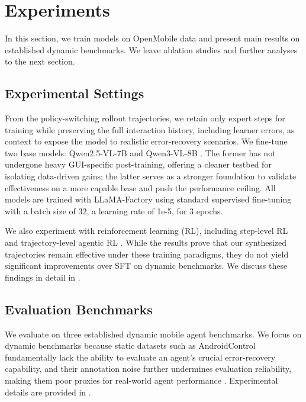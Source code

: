 \documentclass{article} %
\begin{document}
\section{Experiments}

In this section, we train models on OpenMobile data and present main results on established dynamic benchmarks.
We leave ablation studies and further analyses to the next section.

\subsection{Experimental Settings}

From the policy-switching rollout trajectories, we retain only expert steps for training while preserving the full interaction history, including learner errors, as context to expose the model to realistic error-recovery scenarios.
We fine-tune two base models: Qwen2.5-VL-7B and Qwen3-VL-8B \citep{bai2025qwen3}.
The former has not undergone heavy GUI-specific post-training, offering a cleaner testbed for isolating data-driven gains; the latter serves as a stronger foundation to validate effectiveness on a more capable base and push the performance ceiling.
All models are trained with LLaMA-Factory \citep{zheng2024llamafactory} using standard supervised fine-tuning with a batch size of 32, a learning rate of 1e-5, for 3 epochs.

We also experiment with reinforcement learning (RL), including step-level RL \citep{lu2026ui} and trajectory-level agentic RL \citep{li2026themis}.
While the results prove that our synthesized trajectories remain effective under these training paradigms, they do not yield significant improvements over SFT on dynamic benchmarks.
We discuss these findings in detail in .

\subsection{Evaluation Benchmarks}

We evaluate on three established dynamic mobile agent benchmarks.
We focus on dynamic benchmarks because static datasets such as AndroidControl fundamentally lack the ability to evaluate an agent's crucial error-recovery capability, and their annotation noise further undermines evaluation reliability, making them poor proxies for real-world agent performance \citep{lu2025ui, gao2026ui}.
Experimental details are provided in .
\end{document}
